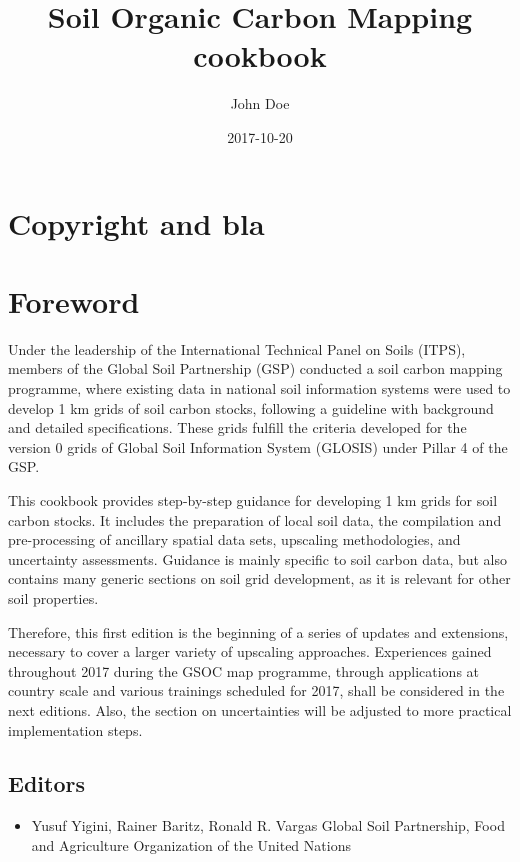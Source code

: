 \documentclass[]{book}
\title{Soil Organic Carbon Mapping cookbook}
\author{John Doe}
\date{2017-10-20}
\providecommand{\tightlist}{%
  \setlength{\itemsep}{0pt}\setlength{\parskip}{0pt}}
\theoremstyle{definition}
\theoremstyle{definition}
\theoremstyle{definition}
\theoremstyle{remark}
\begin{document}
\maketitle

{
\setcounter{tocdepth}{1}
\tableofcontents
}
\chapter{Copyright and bla}\label{copyright-and-bla}

\chapter{Foreword}\label{foreword}

Under the leadership of the International Technical Panel on Soils
(ITPS), members of the Global Soil Partnership (GSP) conducted a soil
carbon mapping programme, where existing data in national soil
information systems were used to develop 1 km grids of soil carbon
stocks, following a guideline with background and detailed
specifications. These grids fulfill the criteria developed for the
version 0 grids of Global Soil Information System (GLOSIS) under Pillar
4 of the GSP.

This cookbook provides step-by-step guidance for developing 1 km grids
for soil carbon stocks. It includes the preparation of local soil data,
the compilation and pre-processing of ancillary spatial data sets,
upscaling methodologies, and uncertainty assessments. Guidance is mainly
specific to soil carbon data, but also contains many generic sections on
soil grid development, as it is relevant for other soil properties.

Therefore, this first edition is the beginning of a series of updates
and extensions, necessary to cover a larger variety of upscaling
approaches. Experiences gained throughout 2017 during the GSOC map
programme, through applications at country scale and various trainings
scheduled for 2017, shall be considered in the next editions. Also, the
section on uncertainties will be adjusted to more practical
implementation steps.

\section{Editors}\label{editors}

\begin{itemize}
\tightlist
\item
  Yusuf Yigini, Rainer Baritz, Ronald R. Vargas Global Soil Partnership,
  Food and Agriculture Organization of the United Nations
\end{itemize}
\end{document}
